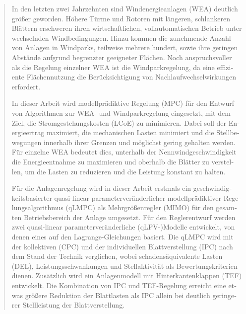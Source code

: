 \documentclass[12pt,a4paper,twoside,openright]{report}
\begin{document}
\begin{otherlanguage}{ngerman}
{\renewcommand{\abstractname}{Kurzfassung}
    \begin{abstract}
In den letzten zwei Jahrzehnten sind Windenergieanlagen (WEA) deutlich größer geworden. Höhere Türme und Rotoren mit längeren, schlankeren Blättern erschweren ihren wirtschaftlichen, vollautomatischen Betrieb unter wechselnden Windbedingungen. Hinzu kommen die zunehmende Anzahl von Anlagen in Windparks, teilweise mehrere hundert, sowie ihre geringen Abstände aufgrund begrenzter geeigneter Flächen. Noch anspruchsvoller als die Regelung einzelner WEA ist die Windparkregelung, da eine effiziente Flächennutzung die Berücksichtigung von Nachlaufwechselwirkungen erfordert.

In dieser Arbeit wird modellprädiktive Regelung (MPC) für den Entwurf von Algorithmen zur WEA- und Windparkregelung eingesetzt, mit dem Ziel, die Stromgestehungskosten (LCoE) zu minimieren. Dabei soll der Energieertrag maximiert, die mechanischen Lasten minimiert und die Stellbewegungen innerhalb ihrer Grenzen und möglichst gering gehalten werden. Für einzelne WEA bedeutet dies, unterhalb der Nennwindgeschwindigkeit die Energieentnahme zu maximieren und oberhalb die Blätter zu verstellen, um die Lasten zu reduzieren und die Leistung konstant zu halten.

Für die Anlagenregelung wird in dieser Arbeit erstmals ein geschwindigkeitsbasierter quasi-linear parameterveränderlicher modellprädiktiver Regelungsalgorithmus (qLMPC) als Mehrgrößenregler (MIMO) für den gesamten Betriebsbereich der Anlage umgesetzt. Für den Reglerentwurf werden zwei quasi-linear parameterveränderliche (qLPV-)Modelle entwickelt, von denen eines auf den Lagrange-Gleichungen basiert. Die qLMPC wird mit der kollektiven (CPC) und der individuellen Blattverstellung (IPC) nach dem Stand der Technik verglichen, wobei schadensäquivalente Lasten (DEL), Leistungsschwankungen und Stellaktivität als Bewertungskriterien dienen. Zusätzlich wird ein Anlagenmodell mit Hinterkantenklappen (TEF) entwickelt. Die Kombination von IPC und TEF-Regelung erreicht eine etwas größere Reduktion der Blattlasten als IPC allein bei deutlich geringerer Stellleistung der Blattverstellung.


\end{abstract}}
\end{otherlanguage}
\end{document}
